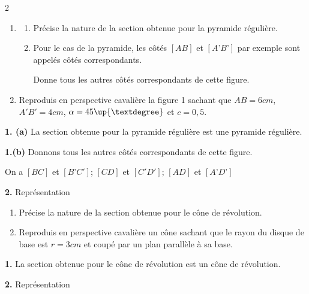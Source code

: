   \begin{multicols*}{2}
  	\begin{enumerate}
  		\item  
  		\begin{enumerate}
  			\item Précise la nature de la section obtenue pour la pyramide régulière.
  			\item  Pour le cas de la pyramide, les côtés $[AB]$ et $[A’B’]$ par exemple sont appelés côtés correspondants.
  			
  			Donne tous les autres côtés correspondants de cette figure.
  		\end{enumerate}
  		\item Reproduis en perspective cavalière la figure 1 sachant que $AB=6cm$, $A'B'=4cm$, $\alpha=45\up{°}$ et $c=0,5$.
  	\end{enumerate}
  	\dure
  	\resul
  	\textbf{1. (a)} La section obtenue pour la pyramide régulière est une pyramide régulière.
  	
  	\textbf{1.(b)} Donnons tous les autres côtés correspondants de cette figure.
  	
  	On a $[BC]$ et $[B’C']$; $[CD]$ et $[C'D']$; $[AD]$ et $[A’D’]$
  	
  	\textbf{2.} Représentation
  	
  	\begin{enumerate}
  		\item  Précise la nature de la section obtenue pour le cône de révolution.
  		\item Reproduis en perspective cavalière un cône  sachant que le rayon du disque de base est $r=3cm$ et coupé par un plan parallèle à sa base.
  	\end{enumerate}
  	\dure
  	\resul
  	\textbf{1.} La section obtenue pour le cône de révolution est un cône de révolution.
  	
  	\textbf{2.} Représentation
  	

\end{multicols*}
